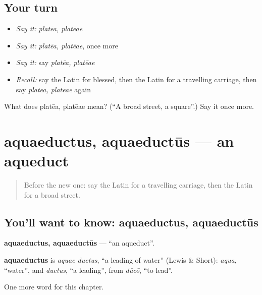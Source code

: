 \subsection*{Your turn}
\begin{itemize}
\raggedright
  \item \emph{Say it:} \emph{platēa, platēae}
  \item \emph{Say it:} \emph{platēa, platēae}, once more
  \item \emph{Say it:} say \emph{platēa, platēae}
  \item \emph{Recall:} say the Latin for blessed, then the Latin for a travelling carriage, then say \emph{platēa, platēae} again
\end{itemize}

\begin{tcolorbox}[breakable,colback=teal!4,colframe=teal!35!black,title={Before you move on}]
What does platēa, platēae mean? (\textquotedblleft{}A broad street, a square\textquotedblright{}.) Say it once more.
\end{tcolorbox}
\section[aquaeductus, aquaeductūs]{aquaeductus, aquaeductūs — an aqueduct}

\label{lesson:LA-C244-aquaeductus}



\begin{quote}
Before the new one: say the Latin for a travelling carriage, then the Latin for a broad street.
\end{quote}

\subsection*{You'll want to know: aquaeductus, aquaeductūs}
\textbf{aquaeductus, aquaeductūs} — \textquotedblleft{}an aqueduct\textquotedblright{}.

\begin{cousinweb}
\textbf{aquaeductus} is \emph{aquae ductus}, \textquotedblleft{}a leading of water\textquotedblright{} (Lewis \& Short): \emph{aqua}, \textquotedblleft{}water\textquotedblright{}, and \emph{ductus}, \textquotedblleft{}a leading\textquotedblright{}, from \emph{dūcō}, \textquotedblleft{}to lead\textquotedblright{}.
\end{cousinweb}

\begin{grammarlens}[title={What you've built}]
One more word for this chapter.
\end{grammarlens}

